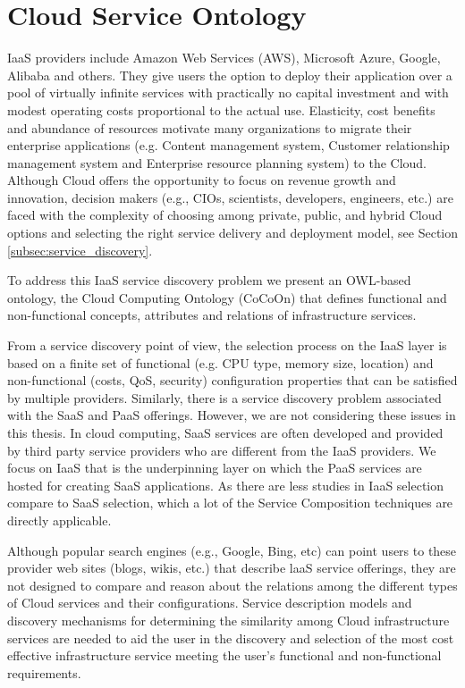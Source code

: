 \chapter{Cloud Service Ontology}
\label{cha:cocoon}
IaaS providers include Amazon Web Services (AWS), Microsoft Azure, Google, Alibaba and others. They give users the option to deploy their application over a pool of virtually infinite services with practically no capital investment and with modest operating costs proportional to the actual use. Elasticity, cost benefits and abundance of resources motivate many organizations to migrate their enterprise applications (e.g. Content management system, Customer relationship management system and Enterprise resource planning system) to the Cloud. Although Cloud offers the opportunity to focus on revenue growth and innovation, decision makers (e.g., CIOs, scientists, developers, engineers, etc.) are faced with the complexity of choosing among private, public, and hybrid Cloud options and selecting the right service delivery and deployment model, see Section \ref{subsec:service_discovery}.

To address this IaaS service discovery problem
we present an OWL-based ontology, the Cloud Computing Ontology (CoCoOn)
that defines functional and non-functional concepts, attributes
and relations of infrastructure services.

From a service discovery point of view, the selection process on the IaaS layer is based on a finite set of functional (e.g. CPU type, memory size, location) and non-functional (costs, QoS, security) configuration properties that can be satisfied by multiple providers. Similarly, there is a service discovery problem associated with the SaaS and PaaS offerings. However, we are not considering these issues in this thesis.
In cloud computing, SaaS services are often developed
and provided by third party service providers who are different from the IaaS providers.
We focus on IaaS that is the underpinning layer
on which the PaaS services are hosted for creating SaaS applications.
As there are less studies in IaaS selection compare to SaaS selection,
which a lot of the Service Composition techniques are directly applicable.


Although popular search engines (e.g., Google, Bing, etc)
can point users to these provider web sites (blogs, wikis, etc.)
that describe laaS service offerings, they are not designed to
compare and reason about the relations among the different
types of Cloud services and their configurations. Service
description models and discovery mechanisms for
determining the similarity among Cloud infrastructure
services are needed to aid the user in the discovery and
selection of the most cost effective infrastructure service
meeting the user's functional and non-functional
requirements.

